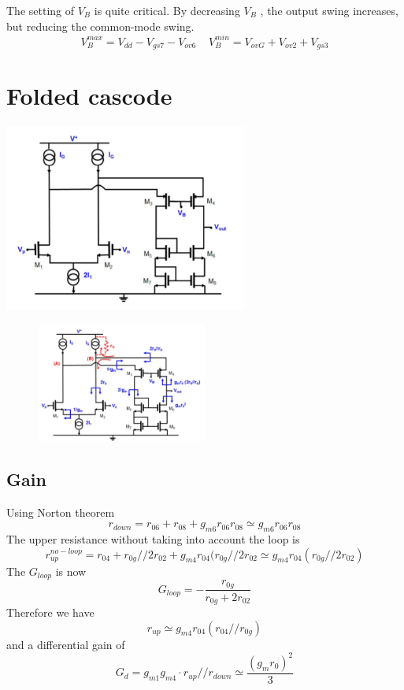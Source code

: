 The setting of $V_B$ is quite critical. By decreasing $V_B$ , the output swing
increases, but reducing the common-mode swing.\\
\begin{equation}
V_B^{max}=V_{dd}-V_{gs7}-V_{ov6}\ \ \ \ \ V_B^{min}=V_{ovG}+V_{ov2}+V_{gs3}
\end{equation}


\section{Folded cascode}

\centering
\includegraphics[width=0.6\textwidth]{foldedcascode.png}\\
\raggedright

\begin{figure}
\includegraphics[width=0.5\textwidth]{foldedcascoderes.png}
\end{figure}
\subsection{Gain}
Using Norton theorem
\begin{equation}
r_{down}=r_{06}+r_{08}+g_{m6}r_{06}r_{08}\simeq g_{m6}r_{06}r_{08}
\end{equation}
The upper resistance without taking into account the loop is 
\begin{equation}
r_{up}^{no-loop}=r_{04}+r_{0g}//2r_{02}+g_{m4}r_{04}(r_{0g}//2r_{02}\simeq g_{m4}r_{04}(r_{0g}//2r_{02})
\end{equation}
The $G_{loop}$ is now 
\begin{equation}
G_{loop}=-\frac{r_{0g}}{r_{0g}+2r_{02}}
\end{equation}
Therefore we have 
\begin{equation}
r_{up}\simeq g_{m4}r_{04}(r_{04}//r_{0g})
\end{equation}
and a differential gain of 
\begin{equation}
G_d=g_{m1}g_{m4}\cdot r_{up}//r_{down}\simeq \frac{(g_mr_0)^2}{3}
\end{equation}

